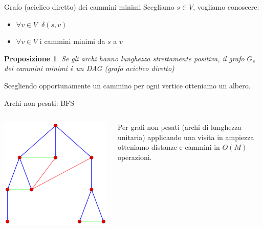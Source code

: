 \documentclass{beamer}
\newcounter{counter1}
\theoremstyle{plain}
\newtheorem{mypro}[counter1]{Proposizione}
\theoremstyle{definition}
\theoremstyle{remark}
\newcommand{\pa}[1]{\left(#1\right)}
\begin{document}
\begin{frame}{Grafo (aciclico diretto) dei cammini minimi}
  Scegliamo $s\in V$, vogliamo conoscere:
  \begin{itemize}
  \item $\forall v\in V\;\; \delta \pa{s,v}$
  \item $\forall v\in V$ i cammini minimi da $s$ a $v$
  \end{itemize}

  \begin{mypro}
    Se gli archi hanno lunghezza strettamente positiva, il grafo $G_s$
    dei cammini minimi \`e un DAG (grafo aciclico diretto)
  \end{mypro}
  Scegliendo opportunamente un cammino per ogni vertice otteniamo un
  albero.
\end{frame}

\begin{frame}{Archi non pesati: BFS}
    \begin{columns}
    \begin{column}{0.40\textwidth}
      \includegraphics[width=\textwidth]{BFS}
    \end{column}
    \begin{column}{0.58\textwidth}
      Per grafi non pesati (archi di lunghezza unitaria) applicando
      una visita in ampiezza otteniamo distanze e cammini in
      $O\pa{M}$ operazioni.
    \end{column}
  \end{columns}
\end{frame}
\end{document}
